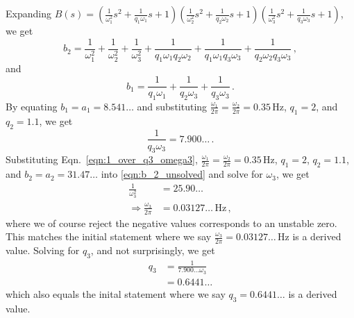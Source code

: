 Expanding $B(s)=\left(\frac{1}{\omega_1^2}s^2+\frac{1}{q_1\omega_1}s+1\right)\left(\frac{1}{\omega_2^2}s^2+\frac{1}{q_2\omega_2}s+1\right)\left(\frac{1}{\omega_3^2}s^2+\frac{1}{q_3\omega_3}s+1\right)$,
we get
\begin{equation}
	b_2 = \frac{1}{\omega_1^2} + \frac{1}{\omega_2^2} + \frac{1}{\omega_3^2} + \frac{1}{q_1\omega_1 q_2\omega_2} + \frac{1}{q_1\omega_1 q_3\omega_3} + \frac{1}{q_2\omega_2 q_3\omega_3}\,,
	\label{eqn:b_2_unsolved}
\end{equation}
and
\begin{equation}
	b_1 = \frac{1}{q_1\omega_1}+\frac{1}{q_2\omega_3}+\frac{1}{q_3\omega_3}\,.
\end{equation}
By equating $b_1=a_1=8.541\dots$ and substituting $\frac{\omega_1}{2\pi}=\frac{\omega_2}{2\pi} = 0.35\,\mathrm{Hz}$, $q_1 = 2$, and $q_2 = 1.1$, we get
\begin{equation}
	\frac{1}{q_3\omega_3} = 7.900\dots\,.
	\label{eqn:1_over_q3_omega3}
\end{equation}
Substituting Eqn.~\eqref{eqn:1_over_q3_omega3}, $\frac{\omega_1}{2\pi}=\frac{\omega_2}{2\pi} = 0.35\,\mathrm{Hz}$, $q_1 = 2$, $q_2 = 1.1$, and $b_2=a_2=31.47\dots$ into \eqref{eqn:b_2_unsolved} and solve for $\omega_3$,
we get
\begin{equation}
	\begin{split}
		\frac{1}{\omega_3^2} &= 25.90\dots\\
		\Rightarrow\frac{\omega_3}{2\pi} &= 0.03127\dots\,\mathrm{Hz}\,,
	\end{split} 
\end{equation}
where we of course reject the negative values corresponds to an unstable zero.
This matches the initial statement where we say $\frac{\omega_3}{2\pi} = 0.03127\dots\,\mathrm{Hz}$ is a derived value.
Solving for $q_3$, and not surprisingly, we get
\begin{equation}
	\begin{split}
		q_3 &= \frac{1}{7.900\dots\omega_3}\\
		&= 0.6441\dots
	\end{split}
\end{equation}
which also equals the inital statement where we say $q_3 = 0.6441\dots$ is a derived value.

